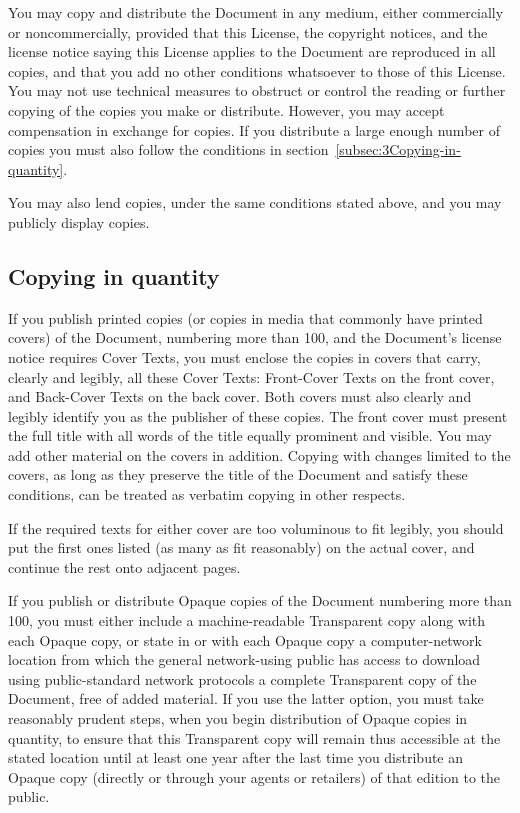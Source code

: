 {\tiny{}You may copy and distribute the Document in any medium, either
commercially or noncommercially, provided that this License, the copyright
notices, and the license notice saying this License applies to the
Document are reproduced in all copies, and that you add no other conditions
whatsoever to those of this License. You may not use technical measures
to obstruct or control the reading or further copying of the copies
you make or distribute. However, you may accept compensation in exchange
for copies. If you distribute a large enough number of copies you
must also follow the conditions in section~\ref{subsec:3Copying-in-quantity}.}{\tiny\par}

{\tiny{}You may also lend copies, under the same conditions stated
above, and you may publicly display copies.}{\tiny\par}

\subsection{Copying in quantity\label{subsec:3Copying-in-quantity}}

{\tiny{}If you publish printed copies (or copies in media that commonly
have printed covers) of the Document, numbering more than 100, and
the Document\textsf{'}s license notice requires Cover Texts, you must enclose
the copies in covers that carry, clearly and legibly, all these Cover
Texts: Front-Cover Texts on the front cover, and Back-Cover Texts
on the back cover. Both covers must also clearly and legibly identify
you as the publisher of these copies. The front cover must present
the full title with all words of the title equally prominent and visible.
You may add other material on the covers in addition. Copying with
changes limited to the covers, as long as they preserve the title
of the Document and satisfy these conditions, can be treated as verbatim
copying in other respects.}{\tiny\par}

{\tiny{}If the required texts for either cover are too voluminous
to fit legibly, you should put the first ones listed (as many as fit
reasonably) on the actual cover, and continue the rest onto adjacent
pages.}{\tiny\par}

{\tiny{}If you publish or distribute Opaque copies of the Document
numbering more than 100, you must either include a machine-readable
Transparent copy along with each Opaque copy, or state in or with
each Opaque copy a computer-network location from which the general
network-using public has access to download using public-standard
network protocols a complete Transparent copy of the Document, free
of added material. If you use the latter option, you must take reasonably
prudent steps, when you begin distribution of Opaque copies in quantity,
to ensure that this Transparent copy will remain thus accessible at
the stated location until at least one year after the last time you
distribute an Opaque copy (directly or through your agents or retailers)
of that edition to the public.}{\tiny\par}

